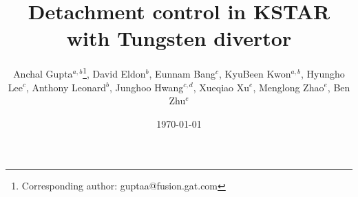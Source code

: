\documentclass[10pt]{iopart}
\begin{document}
\title{Detachment control in KSTAR with Tungsten divertor}

\author{
    Anchal Gupta$^{a, b}$\footnote{Corresponding author: guptaa@fusion.gat.com},
    David Eldon$^b$, 
    Eunnam Bang$^c$, 
    KyuBeen Kwon$^{a, b}$, 
    Hyungho Lee$^c$, 
    Anthony Leonard$^b$, 
    Junghoo Hwang$^{c, d}$, 
    Xueqiao Xu$^e$, 
    Menglong Zhao$^e$, 
    Ben Zhu$^e$
}

\address{$^a$\ORAU}
\address{$^b$\GA}
\address{$^c$\KFE}
\address{$^d$\KAIST}
\address{$^e$\LLNL}

\date{\today}



\submitto{\PPCF}

\maketitle

\ioptwocol

\acresetall  %




















\end{document}
